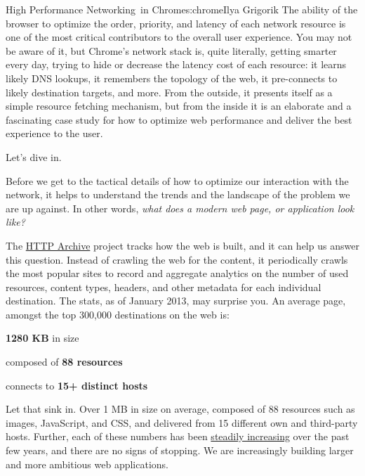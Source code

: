 \begin{aosachapter}{High Performance Networking~in Chrome}{s:chrome}{Ilya Grigorik}
The ability of the browser to optimize the order, priority, and latency
of each network resource is one of the most critical contributors to the
overall user experience. You may not be aware of it, but Chrome's
network stack is, quite literally, getting smarter every day, trying to
hide or decrease the latency cost of each resource: it learns likely DNS
lookups, it remembers the topology of the web, it pre-connects to likely
destination targets, and more. From the outside, it presents itself as a
simple resource fetching mechanism, but from the inside it is an
elaborate and a fascinating case study for how to optimize web
performance and deliver the best experience to the user.

Let's dive in.


Before we get to the tactical details of how to optimize our interaction
with the network, it helps to understand the trends and the landscape of
the problem we are up against. In other words, \emph{what does a modern
web page, or application look like?}

The \href{http://httparchive.org/}{HTTP Archive} project tracks how the
web is built, and it can help us answer this question. Instead of
crawling the web for the content, it periodically crawls the most
popular sites to record and aggregate analytics on the number of used
resources, content types, headers, and other metadata for each
individual destination. The stats, as of January 2013, may surprise you.
An average page, amongst the top 300,000 destinations on the web is:

\newpage

\begin{aosaitemize}

\item
  \textbf{1280 KB} in size
\item
  composed of \textbf{88 resources}
\item
  connects to \textbf{15+ distinct hosts}
\end{aosaitemize}

Let that sink in. Over 1 MB in size on average, composed of 88 resources
such as images, JavaScript, and CSS, and delivered from 15 different own
and third-party hosts. Further, each of these numbers has been
\href{http://httparchive.org/trends.php}{steadily increasing} over the
past few years, and there are no signs of stopping. We are increasingly
building larger and more ambitious web applications.


\end{aosachapter}
